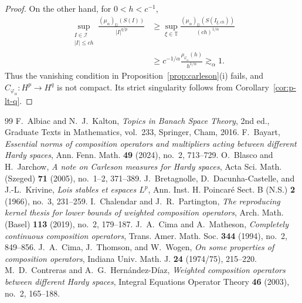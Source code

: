 \documentclass[10pt,a4paper]{amsart}
\newcommand{\D}{\mathbb{D}}
\newcommand{\T}{\mathbb{T}}
\begin{document}
\begin{proof}
On the other hand, for \(0<h<c^{-1}\),
\[
\begin{aligned}
        \sup_{\substack{I\in\mathcal I\\ |I|\le ch}}
        \frac{(\mu_\alpha)_\D(S(I))}{|I|^{q/p}}
        &\ge
        \sup_{\xi\in\T}
        \frac{(\mu_\alpha)_\D(S(I_{\xi,ch}))}{(ch)^{1/\alpha}}\\
        &\ge
        c^{-1/\alpha}
        \frac{\rho_{\varphi_\alpha}(h)}{h^{1/\alpha}}
        \gtrsim_\alpha 1.
\end{aligned}
\]
Thus the vanishing condition in
Proposition~\ref{prop:carleson}\textup{(i)} fails, and
\(C_{\varphi_\alpha}:H^p\to H^q\) is not compact. Its strict
singularity follows from
Corollary~\ref{cor:p-lt-q}.
\end{proof}

\begin{thebibliography}{99}
 F.~Albiac and N.~J.~Kalton, \textit{Topics in Banach Space Theory}, 2nd ed., Graduate Texts in Mathematics, vol.~233, Springer, Cham, 2016.
 F.~Bayart, \textit{Essential norms of composition operators and multipliers acting between different Hardy spaces}, Ann. Fenn. Math. \textbf{49} (2024), no.~2, 713--729.
 O.~Blasco and H.~Jarchow, \textit{A note on Carleson measures for Hardy spaces}, Acta Sci. Math. (Szeged) \textbf{71} (2005), no.~1--2, 371--389.
 J.~Bretagnolle, D.~Dacunha-Castelle, and J.-L.~Krivine, \textit{Lois stables et espaces \(L^p\)}, Ann. Inst. H. Poincar\'e Sect. B (N.S.) \textbf{2} (1966), no.~3, 231--259.
 I.~Chalendar and J.~R.~Partington, \textit{The reproducing kernel thesis for lower bounds of weighted composition operators}, Arch. Math. (Basel) \textbf{113} (2019), no.~2, 179--187.
 J.~A.~Cima and A.~Matheson, \textit{Completely continuous composition operators}, Trans. Amer. Math. Soc. \textbf{344} (1994), no.~2, 849--856.
 J.~A.~Cima, J.~Thomson, and W.~Wogen, \textit{On some properties of composition operators}, Indiana Univ. Math. J. \textbf{24} (1974/75), 215--220.
 M.~D.~Contreras and A.~G.~Hern\'andez-D\'iaz, \textit{Weighted composition operators between different Hardy spaces}, Integral Equations Operator Theory \textbf{46} (2003), no.~2, 165--188.

\end{thebibliography}
\end{document}
